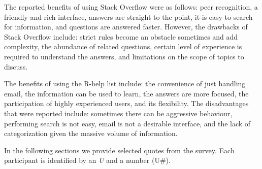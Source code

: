    The reported benefits of using Stack Overflow were as follows: peer recognition, a friendly and rich interface, answers are straight to the point, it is easy to search for information, and questions are answered faster.
    However, the drawbacks of Stack Overflow include: strict rules become an obstacle sometimes and add complexity, the abundance of related questions, certain level of experience is required to understand the answers, and limitations on the scope of topics to discuss.

    The benefits of using the R-help list include: the convenience of just handling email, the information can be used to learn, the answers are more focused, the participation of highly experienced users, and its flexibility.
    The disadvantages that were reported include: sometimes there can be aggressive behaviour, performing search is not easy, email is not a desirable interface, and the lack of categorization given the massive volume of information.

In the following sections we provide selected quotes from the survey.
Each participant is identified by an \emph{U} and a number (U\#).



